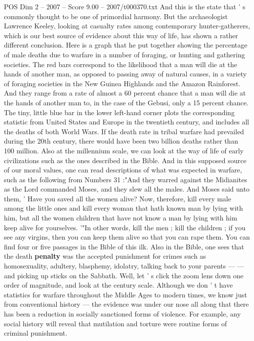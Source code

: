 \begin{textsample}{POS Dim 2 – 2007 – Score 9.00 – 2007/t000370.txt}
And this is the state that ' s commonly thought to be one of primordial harmony.
But the archaeologist Lawrence Keeley, looking at casualty rates among contemporary hunter-gatherers, which is our best source of evidence about this way of life, has shown a rather different conclusion.
Here is a graph that he put together showing the percentage of male deaths due to warfare in a number of foraging, or hunting and gathering societies.
The red bars correspond to the likelihood that a man will die at the hands of another man, as opposed to passing away of natural causes, in a variety of foraging societies in the New Guinea Highlands and the Amazon Rainforest.
And they range from a rate of almost a 60 percent chance that a man will die at the hands of another man to, in the case of the Gebusi, only a 15 percent chance.
The tiny, little blue bar in the lower left-hand corner plots the corresponding statistic from United States and Europe in the twentieth century, and includes all the deaths of both World Wars.
If the death rate in tribal warfare had prevailed during the 20th century, there would have been two billion deaths rather than 100 million.
Also at the millennium scale, we can look at the way of life of early civilizations such as the ones described in the Bible.
And in this supposed source of our moral values, one can read descriptions of what was expected in warfare, such as the following from Numbers 31 :"And they warred against the Midianites as the Lord commanded Moses, and they slew all the males.
And Moses said unto them, ' Have you saved all the women alive?
Now, therefore, kill every male among the little ones and kill every woman that hath known man by lying with him, but all the women children that have not know a man by lying with him keep alive for yourselves. '"In other words, kill the men ; kill the children ; if you see any virgins, then you can keep them alive so that you can rape them.
You can find four or five passages in the Bible of this ilk.
Also in the Bible, one sees that the death \textbf{penalty} was the accepted punishment for crimes such as homosexuality, adultery, blasphemy, idolatry, talking back to your parents — — and picking up sticks on the Sabbath.
Well, let ' s click the zoom lens down one order of magnitude, and look at the century scale.
Although we don ' t have statistics for warfare throughout the Middle Ages to modern times, we know just from conventional history — the evidence was under our nose all along that there has been a reduction in socially sanctioned forms of violence.
For example, any social history will reveal that mutilation and torture were routine forms of criminal punishment.

\end{textsample}
